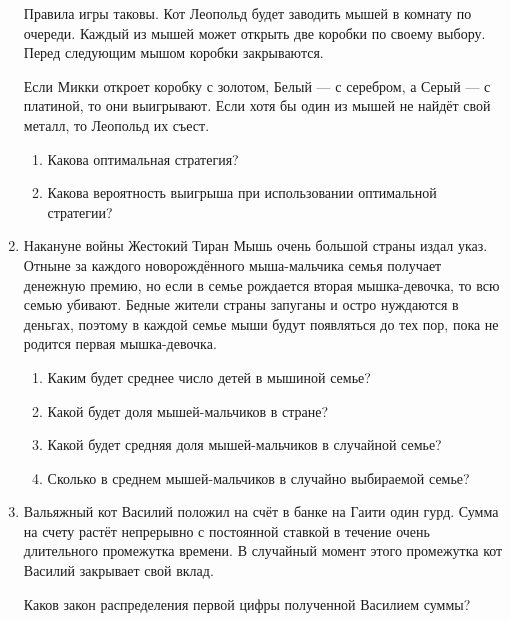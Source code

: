 \begin{enumerate}
Правила игры таковы. Кот Леопольд будет заводить мышей в комнату по очереди. Каждый из мышей может открыть
две коробки по своему выбору. Перед следующим мышом коробки закрываются.

Если Микки откроет коробку с золотом, Белый
— с серебром, а Серый — с платиной, то они выигрывают. Если
хотя бы один из мышей не найдёт свой металл, то Леопольд их съест.
\begin{enumerate}
\item Какова оптимальная стратегия?
\item Какова вероятность выигрыша при использовании оптимальной стратегии?
\end{enumerate}

\item Накануне войны Жестокий Тиран Мышь очень большой страны издал указ. Отныне за каждого новорождённого мыша-мальчика семья получает денежную премию, но если в семье рождается вторая мышка-девочка, то всю семью убивают. Бедные жители страны запуганы и остро нуждаются в деньгах, поэтому в каждой семье мыши будут появляться до тех пор, пока не родится первая мышка-девочка.

\begin{enumerate}
  \item Каким будет среднее число детей в мышиной семье?
  \item Какой будет доля мышей-мальчиков в стране?
  \item Какой будет средняя доля мышей-мальчиков в случайной семье?
  \item Сколько в среднем мышей-мальчиков в случайно выбираемой семье?
\end{enumerate}

\item Вальяжный кот Василий положил на счёт в банке на Гаити один гурд. Сумма на счету растёт непрерывно с постоянной ставкой в течение очень длительного промежутка времени. В случайный момент этого промежутка кот Василий закрывает свой вклад.

Каков закон распределения первой цифры полученной Василием суммы?

\end{enumerate}

